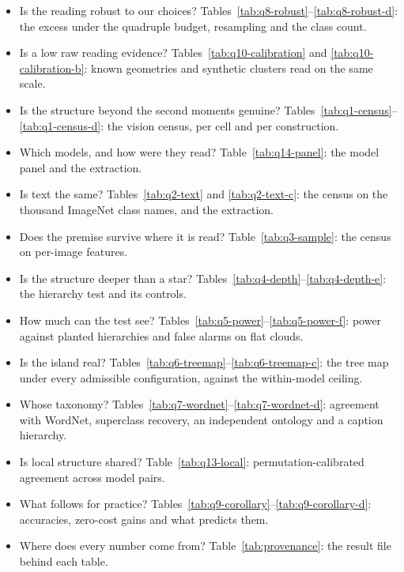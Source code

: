 \documentclass{article}
\theoremstyle{inline}
\theoremstyle{inlineit}
\begin{document}
\begin{itemize}[topsep=2pt,itemsep=1pt,leftmargin=*]
\item Is the reading robust to our choices? Tables~\ref{tab:q8-robust}--\ref{tab:q8-robust-d}: the excess under the quadruple budget, resampling and the class count.
\item Is a low raw reading evidence? Tables~\ref{tab:q10-calibration} and \ref{tab:q10-calibration-b}: known geometries and synthetic clusters read on the same scale.
\item Is the structure beyond the second moments genuine? Tables~\ref{tab:q1-census}--\ref{tab:q1-census-d}: the vision census, per cell and per construction.
\item Which models, and how were they read? Table~\ref{tab:q14-panel}: the model panel and the extraction.
\item Is text the same? Tables~\ref{tab:q2-text} and \ref{tab:q2-text-c}: the census on the thousand ImageNet class names, and the extraction.
\item Does the premise survive where it is read? Table~\ref{tab:q3-sample}: the census on per-image features.
\item Is the structure deeper than a star? Tables~\ref{tab:q4-depth}--\ref{tab:q4-depth-e}: the hierarchy test and its controls.
\item How much can the test see? Tables~\ref{tab:q5-power}--\ref{tab:q5-power-f}: power against planted hierarchies and false alarms on flat clouds.
\item Is the island real? Tables~\ref{tab:q6-treemap}--\ref{tab:q6-treemap-c}: the tree map under every admissible configuration, against the within-model ceiling.
\item Whose taxonomy? Tables~\ref{tab:q7-wordnet}--\ref{tab:q7-wordnet-d}: agreement with WordNet, superclass recovery, an independent ontology and a caption hierarchy.
\item Is local structure shared? Table~\ref{tab:q13-local}: permutation-calibrated agreement across model pairs.
\item What follows for practice? Tables~\ref{tab:q9-corollary}--\ref{tab:q9-corollary-d}: accuracies, zero-cost gains and what predicts them.
\item Where does every number come from? Table~\ref{tab:provenance}: the result file behind each table.
\end{itemize}
\end{document}
